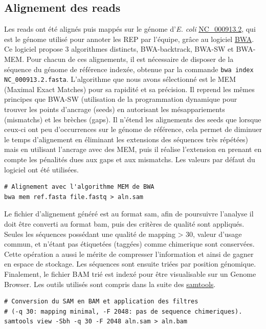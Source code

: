 \documentclass[12pt,a4paper]{report}
\begin{document}
\begin{onehalfspace}
\subsection*{Alignement des reads}
Les reads ont été alignés puis mappés sur le génome d'\textit{E. coli} \href{http://www.ncbi.nlm.nih.gov/nuccore/NC_000913.2}{NC\_000913.2}, qui est le génome utilisé pour annoter les REP par l'équipe, grâce au logiciel \href{http://bio-bwa.sourceforge.net/}{BWA}.  Ce logiciel propose 3 algorithmes distincts, BWA-backtrack, BWA-SW et BWA-MEM. Pour chacun de ces alignements, il est nécessaire de disposer de la séquence du génome de référence indexée, obtenue par la commande \texttt{bwa index NC\_000913.2.fasta}. 
L'algorithme que nous avons sélectionné est le MEM (Maximal Exact Matches) pour sa rapidité et sa précision. Il reprend les mêmes principes que BWA-SW (utilisation de la programmation dynamique pour trouver les points d'ancrage (seeds) en autorisant les mésappariements (mismatchs) et les brèches (gaps). Il n'étend les alignements des seeds que lorsque ceux-ci ont peu d'occurrences sur le génome de référence, cela permet de diminuer le temps d'alignement en éliminant les extensions des séquences très répétées) mais en utilisant l'ancrage avec des MEM, puis il réalise l'extension en prenant en compte les pénalités dues aux gaps et aux mismatchs. Les valeurs par défaut du logiciel ont été utilisées.
\begin{lstlisting}[frame=single]
# Alignement avec l'algorithme MEM de BWA
bwa mem ref.fasta file.fastq > aln.sam
\end{lstlisting}
Le fichier d'alignement généré est au format \gls{sam}, afin de poursuivre l'analyse il doit être converti au format \gls{bam}, puis des critères de qualité sont appliqués. Seules les séquences possédant une qualité de mapping > 30, valeur d'usage commun, et n'étant pas étiquetées (taggées) comme \gls{chimerique} sont conservées. Cette opération a aussi le mérite de compresser l'information et ainsi de gagner en espace de stockage. Les séquences sont ensuite triées par position génomique. Finalement, le fichier BAM trié est indexé pour être visualisable sur un Genome Browser. Les outils utilisés sont compris dans la suite des \href{http://samtools.sourceforge.net/samtools.shtml}{samtools}.
\begin{lstlisting}[frame=single]
# Conversion du SAM en BAM et application des filtres
# (-q 30: mapping minimal, -F 2048: pas de sequence chimeriques).
samtools view -Sbh -q 30 -F 2048 aln.sam > aln.bam


\end{lstlisting}
\end{onehalfspace}
\end{document}
